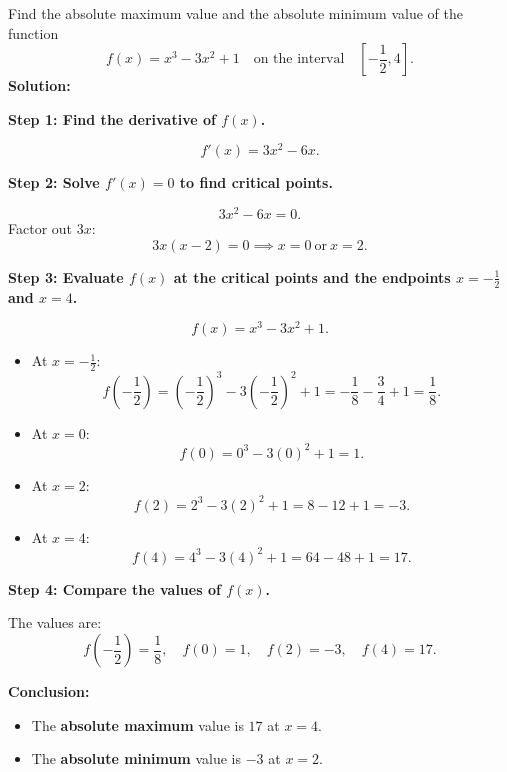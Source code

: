\documentclass[12pt]{article}
\theoremstyle{beautifulthm}
\begin{document}
\begin{tcolorbox}[colback=examplebg, colframe=red!75!black, title=\textbf{EXAMPLE 1: Find the Absolute Value}, fonttitle=\bfseries, sharp corners]
Find the absolute maximum value and the absolute minimum value of the function
\[
f(x) = x^3 - 3x^2 + 1 \quad \text{on the interval} \quad \left[ -\frac{1}{2}, 4 \right].
\]
\tcblower
\textbf{Solution:} 
\vspace{2mm}

\textbf{Step 1: Find the derivative of \( f(x) \).}

\[
f'(x) = 3x^2 - 6x.
\]

\textbf{Step 2: Solve \( f'(x) = 0 \) to find critical points.}

\[
3x^2 - 6x = 0.
\]
Factor out \( 3x \):
\[
3x(x - 2) = 0 \implies x = 0 \ \text{or} \ x = 2.
\]

\textbf{Step 3: Evaluate \( f(x) \) at the critical points and the endpoints \( x = -\frac{1}{2} \) and \( x = 4 \).}

\[
f(x) = x^3 - 3x^2 + 1.
\]
\begin{itemize}
    \item At \( x = -\frac{1}{2} \):
    \[
    f\left( -\frac{1}{2} \right) = \left( -\frac{1}{2} \right)^3 - 3\left( -\frac{1}{2} \right)^2 + 1 = -\frac{1}{8} - \frac{3}{4} + 1 = \frac{1}{8}.
    \]

    \item At \( x = 0 \):
    \[
    f(0) = 0^3 - 3(0)^2 + 1 = 1.
    \]

    \item At \( x = 2 \):
    \[
    f(2) = 2^3 - 3(2)^2 + 1 = 8 - 12 + 1 = -3.
    \]

    \item At \( x = 4 \):
    \[
    f(4) = 4^3 - 3(4)^2 + 1 = 64 - 48 + 1 = 17.
    \]
\end{itemize}

\textbf{Step 4: Compare the values of \( f(x) \).}

The values are:
\[
f\left( -\frac{1}{2} \right) = \frac{1}{8}, \quad f(0) = 1, \quad f(2) = -3, \quad f(4) = 17.
\]

\textbf{Conclusion:}

\begin{itemize}
    \item The \textbf{absolute maximum} value is \( 17 \) at \( x = 4 \).
    \item The \textbf{absolute minimum} value is \( -3 \) at \( x = 2 \).
\end{itemize}
\end{tcolorbox}
\end{document}
